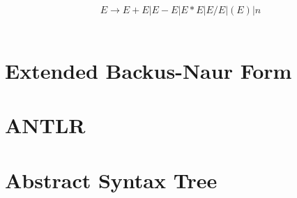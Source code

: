\[ E \rightarrow E + E | E - E | E * E | E / E | (E) | n \]\\




\section{Extended Backus-Naur Form}

\section{ANTLR}


\section{Abstract Syntax Tree}


